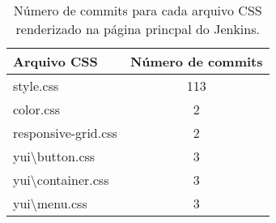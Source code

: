 \begin{table}[!htbp]
	\centering
	\caption{Número de commits para cada arquivo CSS renderizado na página princpal do Jenkins.}
	\label{tab:commits}
	\begin{tabular}{l|c}
		\textbf{Arquivo CSS} & \textbf{Número de commits} \\ \hline
		style.css            & 113                        \\
		color.css            & 2                          \\
		responsive-grid.css  & 2                          \\
		yui\textbackslash button.css       & 3                          \\
		yui\textbackslash container.css    & 3                          \\
		yui\textbackslash menu.css         & 3                         
	\end{tabular}
\end{table}